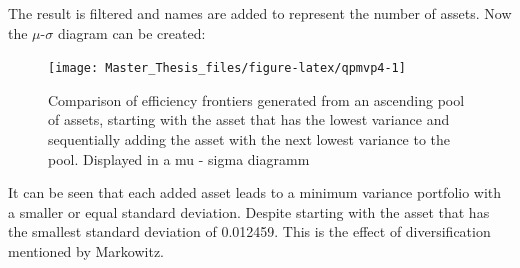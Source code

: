 \documentclass[
  oneside, a4paper, 12pt, openany]{book}
\newenvironment{Shaded}{\begin{snugshade}}{\end{snugshade}}
\newcommand{\AttributeTok}[1]{\textcolor[rgb]{0.77,0.63,0.00}{#1}}
\newcommand{\ConstantTok}[1]{\textcolor[rgb]{0.00,0.00,0.00}{#1}}
\newcommand{\ControlFlowTok}[1]{\textcolor[rgb]{0.13,0.29,0.53}{\textbf{#1}}}
\newcommand{\DecValTok}[1]{\textcolor[rgb]{0.00,0.00,0.81}{#1}}
\newcommand{\FloatTok}[1]{\textcolor[rgb]{0.00,0.00,0.81}{#1}}
\newcommand{\FunctionTok}[1]{\textcolor[rgb]{0.00,0.00,0.00}{#1}}
\newcommand{\NormalTok}[1]{#1}
\newcommand{\OtherTok}[1]{\textcolor[rgb]{0.56,0.35,0.01}{#1}}
\newcommand{\SpecialCharTok}[1]{\textcolor[rgb]{0.00,0.00,0.00}{#1}}
\newcommand{\StringTok}[1]{\textcolor[rgb]{0.31,0.60,0.02}{#1}}
\theoremstyle{definition}
\theoremstyle{definition}
\theoremstyle{definition}
\theoremstyle{definition}
\theoremstyle{remark}
\begin{document}
\begin{Shaded}
\end{Shaded}

\normalsize\vspace{0.1cm}

The result is filtered and names are added to represent the number of assets. Now the \(\mu\)-\(\sigma\) diagram can be created:

\begin{figure}[H]
\texttt{[image: Master\_Thesis\_files/figure-latex/qpmvp4-1]} \caption{Comparison of efficiency frontiers generated from an ascending pool of assets, starting with the asset that has the lowest variance and sequentially adding the asset with the next lowest variance to the pool. Displayed in a mu - sigma diagramm}\label{fig:qpmvp4}
\end{figure}

It can be seen that each added asset leads to a minimum variance portfolio with a smaller or equal standard deviation. Despite starting with the asset that has the smallest standard deviation of 0.012459. This is the effect of diversification mentioned by Markowitz.
\end{document}
